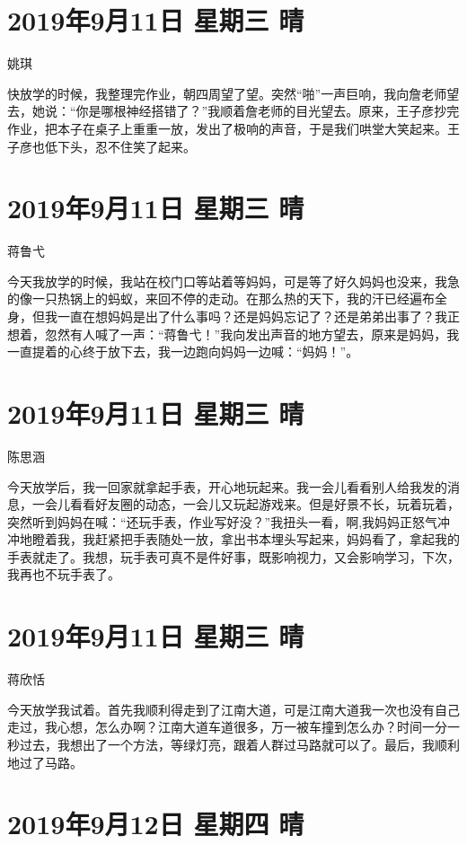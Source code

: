 \section{2019年9月11日 星期三 晴}

姚琪

快放学的时候，我整理完作业，朝四周望了望。突然``啪''一声巨响，我向詹老师望去，她说：``你是哪根神经搭错了？''我顺着詹老师的目光望去。原来，王子彦抄完作业，把本子在桌子上重重一放，发出了极响的声音，于是我们哄堂大笑起来。王子彦也低下头，忍不住笑了起来。

\section{2019年9月11日 星期三 晴}

蒋鲁弋

今天我放学的时候，我站在校门口等站着等妈妈，可是等了好久妈妈也没来，我急的像一只热锅上的蚂蚁，来回不停的走动。在那么热的天下，我的汗已经遍布全身，但我一直在想妈妈是出了什么事吗？还是妈妈忘记了？还是弟弟出事了？我正想着，忽然有人喊了一声：``蒋鲁弋！''我向发出声音的地方望去，原来是妈妈，我一直提着的心终于放下去，我一边跑向妈妈一边喊：``妈妈！''。

\section{2019年9月11日 星期三 晴}

陈思涵

今天放学后，我一回家就拿起手表，开心地玩起来。我一会儿看看别人给我发的消息，一会儿看看好友圈的动态，一会儿又玩起游戏来。但是好景不长，玩着玩着，突然听到妈妈在喊：``还玩手表，作业写好没？''我扭头一看，啊,我妈妈正怒气冲冲地瞪着我，我赶紧把手表随处一放，拿出书本埋头写起来，妈妈看了，拿起我的手表就走了。我想，玩手表可真不是件好事，既影响视力，又会影响学习，下次，我再也不玩手表了。

\section{2019年9月11日 星期三 晴}

蒋欣恬

今天放学我试着。首先我顺利得走到了江南大道，可是江南大道我一次也没有自己走过，我心想，怎么办啊？江南大道车道很多，万一被车撞到怎么办？时间一分一秒过去，我想出了一个方法，等绿灯亮，跟着人群过马路就可以了。最后，我顺利地过了马路。

\section{2019年9月12日 星期四 晴}

